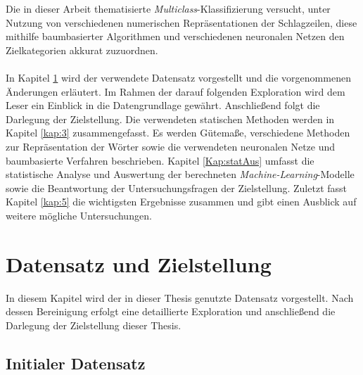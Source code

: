 \documentclass[a4paper,11pt]{article}
\begin{document}
Die in dieser Arbeit thematisierte \textit{Multiclass}-Klassifizierung versucht, unter Nutzung von verschiedenen numerischen Repräsentationen der Schlagzeilen, diese mithilfe baumbasierter Algorithmen und verschiedenen neuronalen Netzen den Zielkategorien akkurat zuzuordnen.\\
\\
In Kapitel \ref{kap:2} wird der verwendete Datensatz vorgestellt und die vorgenommenen Änderungen erläutert. Im Rahmen der darauf folgenden Exploration wird dem Leser ein Einblick in die Datengrundlage gewährt.
Anschließend folgt die Darlegung der Zielstellung. Die verwendeten statischen Methoden werden in Kapitel \ref{kap:3} zusammengefasst. Es werden Gütemaße, verschiedene Methoden zur Repräsentation der Wörter sowie die verwendeten neuronalen Netze und baumbasierte Verfahren beschrieben. Kapitel \ref{Kap:statAus} umfasst die statistische Analyse und Auswertung der berechneten \textit{Machine-Learning}-Modelle sowie die Beantwortung der Untersuchungsfragen der Zielstellung. Zuletzt fasst Kapitel \ref{kap:5} die wichtigsten Ergebnisse zusammen und gibt einen Ausblick auf weitere mögliche Untersuchungen.

\newpage

\section{Datensatz und Zielstellung}\label{kap:2}

In diesem Kapitel wird der in dieser Thesis genutzte Datensatz vorgestellt. Nach dessen Bereinigung erfolgt eine detaillierte Exploration und anschließend die Darlegung der Zielstellung dieser Thesis.


\subsection{Initialer Datensatz}
\end{document}
